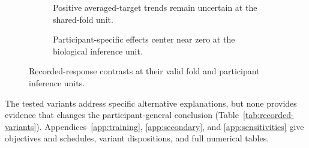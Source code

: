 \begin{figure}[tbp]
  \centering
  \begin{subfigure}[t]{\textwidth}
    \centering
    \resizebox{\linewidth}{!}{}
    \par\vspace{0.45em}
    \caption{Positive averaged-target trends remain uncertain at the shared-fold unit.}
    \label{fig:recorded-response-averaged}
  \end{subfigure}
  \par\smallskip
  \begin{subfigure}[t]{\textwidth}
    \centering
    \resizebox{\linewidth}{!}{}
    \par\vspace{0.45em}
    \caption{Participant-specific effects center near zero at the biological inference unit.}
    \label{fig:recorded-response-participant}
  \end{subfigure}
  \caption{Recorded-response contrasts at their valid fold and participant inference units.}
  \label{fig:recorded-response-inference}
\end{figure}

The tested variants address specific alternative explanations, but none provides evidence that changes the participant-general conclusion (Table~\ref{tab:recorded-variants}).
Appendices~\ref{app:training}, \ref{app:secondary}, and \ref{app:sensitivities} give objectives and schedules, variant dispositions, and full numerical tables.


